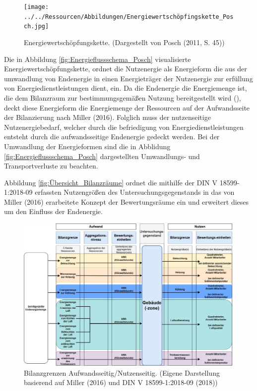 \begin{figure}[H]
    \centering
    \texttt{[image: ../../Ressourcen/Abbildungen/Energiewertschöpfingskette\_Posch.jpg]}
    \caption{Energiewertschöpfungskette. (Dargestellt von Posch (2011, S. 45))}
    \label{fig:Energieflussschema_Posch}
\end{figure}

Die in Abbildung \eqref{fig:Energieflussschema_Posch} visualisierte Energiewertschöpfungskette, ordnet die Nutzenergie als Energieform die aus der umwandlung von Endenergie 
in einen Energieträger der Nutzenergie zur erfüllung von Energiedienstleistungen dient, ein.
Da die Endenergie die Energiemenge ist, die dem Bilanzraum zur bestimmungsgemäßen Nutzung bereitgestellt wird (\cite[Kapitel 3.1.2]{DIN18599.2018}), 
deckt diese Energieform die Energiemenge der Ressourcen auf der Aufwandsseite der Bilanzierung nach Miller (2016).
Folglich muss der nutzenseitige Nutzenergiebedarf, welcher durch die befriedigung von Energiedienstleistungen entsteht durch die aufwandsseitige Endenergie gedeckt werden.
Bei der Umwandlung der Energieformen sind die in Abblidung \eqref{fig:Energieflussschema_Posch} dargestellten Umwandlungs- und Transportverluste zu beachten.


Abbildung \eqref{fig:Übersicht_Bilanzräume} ordnet die mithilfe der DIN V 18599-1:2018-09 erfassten Nutzengrößen des Untersuchungsgegenstands in das von 
Miller (2016) erarbeitete Konzept der Bewertungsräume ein und erweitert dieses um den Einfluss der Endenergie.

\begin{figure}[H]
    \centering
    \includegraphics[width=1\textwidth]{../../Ressourcen/Abbildungen/Nutzengröße_Bewertungseinheit.jpg}
    \caption{Bilanzgrenzen Aufwandsseitig/Nutzenseitig. (Eigene Darstellung basierend auf Miller (2016) und DIN V 18599-1:2018-09 (2018))}
    \label{fig:Übersicht_Bilanzräume}
\end{figure}

